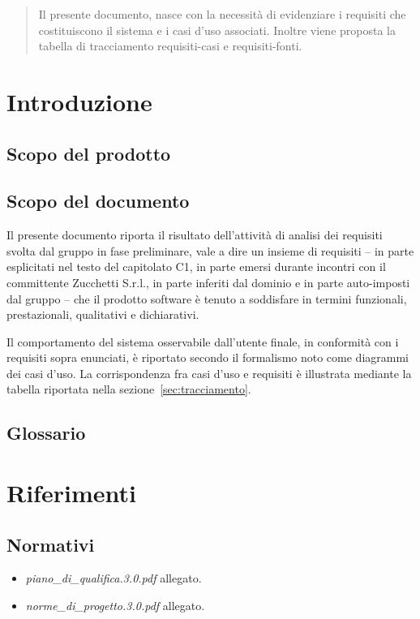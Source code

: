 
\begin{abstract}
Il presente documento, nasce con la necessità di evidenziare i requisiti che costituiscono il sistema e i casi d'uso associati. Inoltre viene proposta la tabella di tracciamento requisiti-casi e requisiti-fonti.
\end{abstract}

\newpage

\section{Introduzione}
\subsection{Scopo del prodotto}
\purpose

\subsection{Scopo del documento}
Il presente documento riporta il risultato dell'attività di analisi dei requisiti svolta dal gruppo \team{} in fase preliminare, vale a dire un insieme di requisiti -- in parte esplicitati nel testo del capitolato C1, in parte emersi durante incontri con il committente Zucchetti S.r.l., in parte inferiti dal dominio e in parte auto-imposti dal gruppo -- che il prodotto software è tenuto a soddisfare in termini funzionali, prestazionali, qualitativi e dichiarativi.

Il comportamento del sistema osservabile dall'utente finale, in conformità con i requisiti sopra enunciati, è riportato secondo il formalismo noto come diagrammi dei casi d'uso. La corrispondenza fra casi d'uso e requisiti è illustrata mediante la tabella riportata nella sezione~\ref{sec:tracciamento}.

\subsection{Glossario}
\glossaryIntro

\clearpage
\section{Riferimenti}

\subsection{Normativi}
\begin{itemize}
\item[] \textit{piano\_di\_qualifica.3.0.pdf} allegato.
\item[] \textit{norme\_di\_progetto.3.0.pdf} allegato.
\end{itemize}

